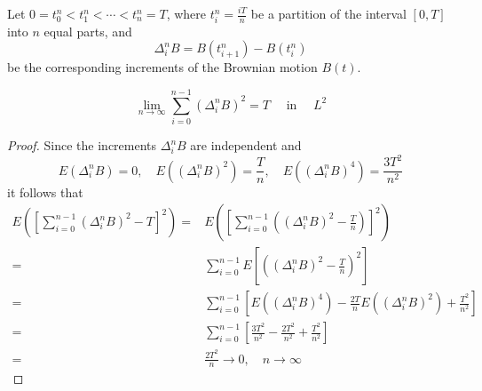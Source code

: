 Let $0=t_{0}^{n}<t_{1}^{n}<\cdots<t_{n}^{n}=T$, where $t_{i}^{n}=\frac{iT}{n}$ be a partition of the interval $[0,T]$ into $n$ equal parts, and
\begin{equation}
	\Delta_{i}^{n}B=B\left(t_{i+1}^{n}\right)-B\left(t_{i}^{n}\right)
\end{equation}
be the corresponding increments of the Brownian motion $B(t)$.

\begin{theorem} \label{thm:limited-square-variation}
	\begin{equation}
		\lim_{n\rightarrow\infty}\sum_{i=0}^{n-1}\left(\Delta_{i}^{n}B\right)^{2}=T\quad\text { in }\quad L^{2}
	\end{equation}
\end{theorem}

\begin{proof}
	Since the increments $\Delta_{i}^{n}B$ are independent and
	\begin{equation*}
		E\left(\Delta_{i}^{n}B\right)=0,\quad E\left(\left(\Delta_{i}^{n}B\right)^{2}\right)=\frac{T}{n},\quad E\left(\left(\Delta_{i}^{n}B\right)^{4}\right)=\frac{3T^{2}}{n^{2}}
	\end{equation*}
	it follows that
	\begin{equation*}
		\begin{aligned}
			E\left(\left[\sum_{i=0}^{n-1}\left(\Delta_{i}^{n}B\right)^{2}-T\right]^{2}\right)= & E\left(\left[\sum_{i=0}^{n-1}\left(\left(\Delta_{i}^{n}B\right)^{2}-\frac{T}{n}\right)\right]^{2}\right)                                                   \\
			=                                                                                  & \sum_{i=0}^{n-1}E\left[\left(\left(\Delta_{i}^{n}B\right)^{2}-\frac{T}{n}\right)^{2}\right]                                                                \\
			=                                                                                  & \sum_{i=0}^{n-1}\left[E\left(\left(\Delta_{i}^{n}B\right)^{4}\right)-\frac{2T}{n}E\left(\left(\Delta_{i}^{n}B\right)^{2}\right)+\frac{T^{2}}{n^{2}}\right] \\
			=                                                                                  & \sum_{i=0}^{n-1}\left[\frac{3T^{2}}{n^{2}}-\frac{2T^{2}}{n^{2}}+\frac{T^{2}}{n^{2}}\right]                                                                 \\
			=                                                                                  & \frac{2T^{2}}{n}\rightarrow 0,\quad n\rightarrow\infty
		\end{aligned}
	\end{equation*}
\end{proof}

